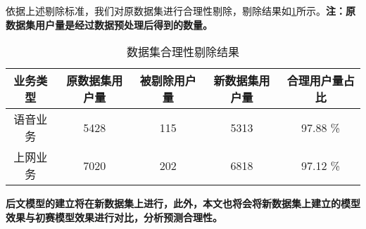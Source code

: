 \documentclass{MathorCupmodeling}
\begin{document}
	依据上述剔除标准，我们对原数据集进行合理性剔除，剔除结果如\textcolor{blue}{\cref{tab:剔除结果}}所示。\textbf{注：原数据集用户量是经过数据预处理后得到的数量。}
\begin{table}[H]
	\centering
	\caption{数据集合理性剔除结果}
	  \begin{tabular}{ccccc}
	  \toprule
	  \textbf{业务类型} & \textbf{原数据集用户量} & \textbf{被剔除用户量} & \textbf{新数据集用户量} & \textbf{合理用户量占比} \\
	  \midrule
	  语音业务  & 5428  & 115   & 5313  & 97.88 \% \\
	  上网业务  & 7020  & 202   & 6818  & 97.12 \% \\
	  \bottomrule
	  \end{tabular}
	\label{tab:剔除结果}
\end{table}
\textbf{后文模型的建立将在新数据集上进行，此外，本文也将会将新数据集上建立的模型效果与初赛模型效果进行对比，分析预测合理性。}
\end{document}
